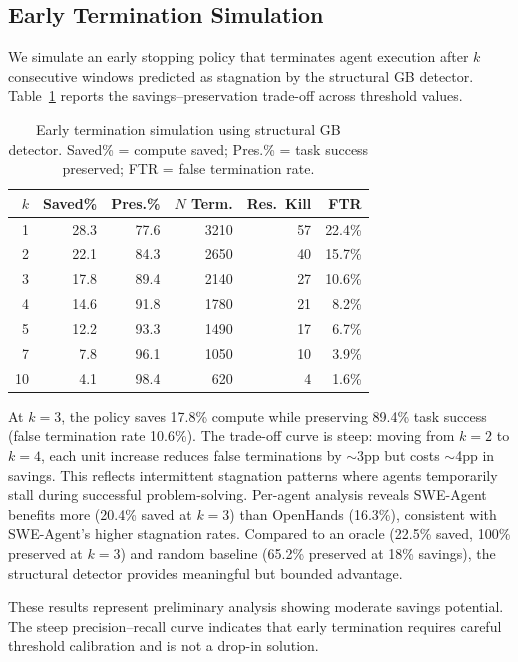 \documentclass[11pt,a4paper]{article}
\begin{document}
\subsection{Early Termination Simulation}
\label{sec:et}

We simulate an early stopping policy that terminates agent execution after $k$ consecutive windows predicted as stagnation by the structural GB detector. Table~\ref{tab:et} reports the savings--preservation trade-off across threshold values.

\begin{table}[t]
\centering
\small
\caption{Early termination simulation using structural GB detector. Saved\% = compute saved; Pres.\% = task success preserved; FTR = false termination rate.}
\label{tab:et}
\begin{tabular}{rrrrrr}
\toprule
$k$ & \textbf{Saved\%} & \textbf{Pres.\%} & \textbf{$N$ Term.} & \textbf{Res.\ Kill} & \textbf{FTR} \\
\midrule
1 & 28.3 & 77.6 & 3210 & 57 & 22.4\% \\
2 & 22.1 & 84.3 & 2650 & 40 & 15.7\% \\
3 & 17.8 & 89.4 & 2140 & 27 & 10.6\% \\
4 & 14.6 & 91.8 & 1780 & 21 & 8.2\% \\
5 & 12.2 & 93.3 & 1490 & 17 & 6.7\% \\
7 & 7.8 & 96.1 & 1050 & 10 & 3.9\% \\
10 & 4.1 & 98.4 & 620 & 4 & 1.6\% \\
\bottomrule
\end{tabular}
\vspace{-2mm}
\end{table}

At $k{=}3$, the policy saves 17.8\% compute while preserving 89.4\% task success (false termination rate 10.6\%). The trade-off curve is steep: moving from $k{=}2$ to $k{=}4$, each unit increase reduces false terminations by $\sim$3pp but costs $\sim$4pp in savings. This reflects intermittent stagnation patterns where agents temporarily stall during successful problem-solving. Per-agent analysis reveals SWE-Agent benefits more (20.4\% saved at $k{=}3$) than OpenHands (16.3\%), consistent with SWE-Agent's higher stagnation rates. Compared to an oracle (22.5\% saved, 100\% preserved at $k{=}3$) and random baseline (65.2\% preserved at 18\% savings), the structural detector provides meaningful but bounded advantage.

These results represent preliminary analysis showing moderate savings potential. The steep precision--recall curve indicates that early termination requires careful threshold calibration and is not a drop-in solution.
\end{document}
